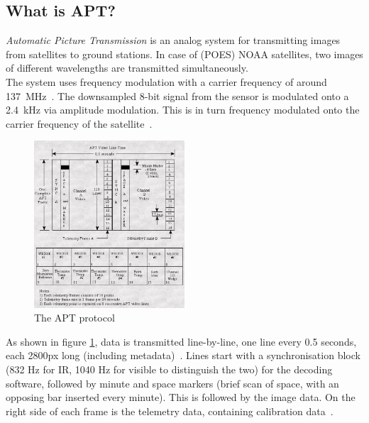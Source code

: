\documentclass[conference]{IEEEtran}
\begin{document}
\subsection{What is APT?}
\textit{Automatic Picture Transmission} is an analog system for transmitting images from satellites to ground stations. In case of (POES) NOAA satellites, two images of different wavelengths are transmitted simultaneously.\\
The system uses frequency modulation with a carrier frequency of around 137~MHz~\cite{NOAA19status}. The downsampled 8-bit signal from the sensor is modulated onto a 2.4~kHz via amplitude modulation. This is in turn frequency modulated onto the carrier frequency of the satellite~\cite{NOAA19building}.\\
\begin{figure}
\centering
\caption{The APT protocol~\cite{NOAA19building}} \label{fig:aptprotocol}
\includegraphics[width=0.5\textwidth]{apt_protocol}
\end{figure}
As shown in figure \ref{fig:aptprotocol}, data is transmitted line-by-line, one line every 0.5 seconds, each 2800px long (including metadata)~\cite[2]{dascal2012advanced}. Lines start with a synchronisation block (832 Hz for IR, 1040 Hz for visible to distinguish the two) for the decoding software, followed by minute and space markers (brief scan of space, with an opposing bar inserted every minute). This is followed by the image data. On the right side of each frame is the telemetry data, containing calibration data~\cite[41-42]{NOAA19building}.
\end{document}
